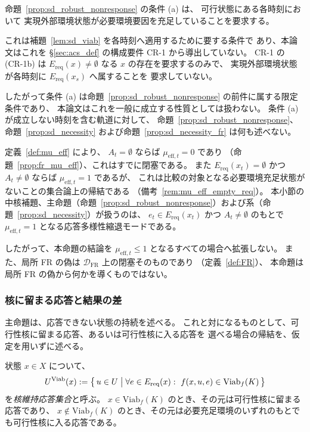 \begin{remark}[条件 (a) の役割と強さ]
\label{rem:req_condition_role}
命題~\ref{prop:sd_robust_nonresponse} の条件 (a) は、
可行状態にある各時刻において
実現外部環境状態が必要環境要因を充足していることを要求する。

これは補題~\ref{lem:sd_viab} を各時刻へ適用するために要する条件で
あり、本論文はこれを \S\ref{sec:acs_def} の構成要件 CR-1 から導出していない。
CR-1 の (CR-1b) は
$E_{\mathrm{req}}(x)\neq\emptyset$ なる $x$ の存在を要求するのみで、
実現外部環境状態が各時刻に $E_{\mathrm{req}}(x_s)$ へ属することを
要求していない。

したがって条件 (a) は命題~\ref{prop:sd_robust_nonresponse} の前件に属する限定条件であり、
本論文はこれを一般に成立する性質としては扱わない。
条件 (a) が成立しない時刻を含む軌道に対して、
命題~\ref{prop:sd_robust_nonresponse}、命題~\ref{prop:sd_necessity} および命題~\ref{prop:sd_necessity_fr} は何も述べない。
\end{remark}

\begin{remark}[本命題が扱う縮退モード]
\label{rem:sd_failure_mode_scope}
定義~\ref{def:mu_eff} により、
$A_t=\emptyset$ ならば $\mu_{\mathrm{eff},t}=0$ であり
（命題~\ref{prop:fr_mu_eff}）、これはすでに閉塞である。
また $E_{\mathrm{req}}(x_t)=\emptyset$ かつ $A_t\neq\emptyset$ ならば
$\mu_{\mathrm{eff},t}=1$ であるが、
これは比較の対象となる必要環境充足状態がないことの集合論上の帰結である
（備考~\ref{rem:mu_eff_empty_req}）。
本小節の中核補題、主命題（命題~\ref{prop:sd_robust_nonresponse}）および系（命題~\ref{prop:sd_necessity}）が扱うのは、
$e_t\in E_{\mathrm{req}}(x_t)$ かつ $A_t\neq\emptyset$ のもとで
$\mu_{\mathrm{eff},t}=1$ となる応答多様性縮退モードである。

したがって、本命題の結論を
$\mu_{\mathrm{eff},t}\le1$ となるすべての場合へ拡張しない。
また、局所 FR の偽は $\mathcal{D}_{\mathrm{FR}}$ 上の閉塞そのものであり
（定義~\ref{def:FR}）、
本命題は局所 FR の偽から何かを導くものではない。
\end{remark}

\subsubsection{核に留まる応答と結果の差}

主命題は、応答できない状態の持続を述べる。
これと対になるものとして、可行性核に留まる応答、あるいは可行性核に入る応答を
選べる場合の帰結を、仮定を用いずに述べる。

\begin{definition}
\label{def:kernel_response}
状態 $x\in X$ について、
\[
  U^{\mathrm{Viab}}(x)
  :=
  \bigl\{\,u\in U\bigm|\forall e\in E_{\mathrm{req}}(x):\ f(x,u,e)\in\mathrm{Viab}_f(K)\,\bigr\}
\]
を\emph{核維持応答集合}と呼ぶ。
$x\in\mathrm{Viab}_f(K)$ のとき、その元は可行性核に留まる応答であり、
$x\notin\mathrm{Viab}_f(K)$ のとき、その元は必要充足環境のいずれのもとでも可行性核に入る応答である。
\end{definition}

